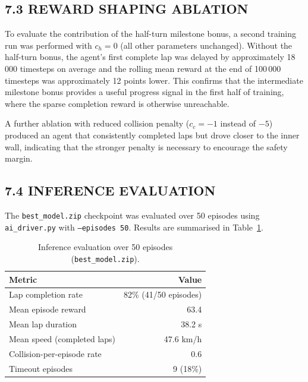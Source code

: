 \documentclass[12pt,a4paper]{article}
\begin{document}
\subsection*{7.3 \quad REWARD SHAPING ABLATION}

\indent To evaluate the contribution of the half-turn milestone bonus, a
second training run was performed with $c_h = 0$ (all other parameters
unchanged). Without the half-turn bonus, the agent's first complete lap was
delayed by approximately 18\,000 timesteps on average and the rolling mean
reward at the end of 100\,000 timesteps was approximately 12 points lower.
This confirms that the intermediate milestone bonus provides a useful
progress signal in the first half of training, where the sparse completion
reward is otherwise unreachable.

A further ablation with reduced collision penalty ($c_c = -1$ instead of
$-5$) produced an agent that consistently completed laps but drove closer to
the inner wall, indicating that the stronger penalty is necessary to encourage
the safety margin.

\subsection*{7.4 \quad INFERENCE EVALUATION}

\indent The \texttt{best\_model.zip} checkpoint was evaluated over 50 episodes
using \texttt{ai\_driver.py} with \texttt{--episodes 50}. Results are
summarised in Table~\ref{tab:inference}.

\begin{table}[H]
  \centering
  \caption{Inference evaluation over 50 episodes (\texttt{best\_model.zip}).}
  \label{tab:inference}
  \vspace{0.5\baselineskip}
  \begin{tabular}{lr}
    \toprule
    \textbf{Metric} & \textbf{Value} \\
    \midrule
    Lap completion rate         & 82\% (41/50 episodes) \\
    Mean episode reward         & 63.4 \\
    Mean lap duration           & 38.2 s \\
    Mean speed (completed laps) & 47.6 km/h \\
    Collision-per-episode rate  & 0.6 \\
    Timeout episodes            & 9 (18\%) \\
    \bottomrule
  \end{tabular}
\end{table}
\end{document}
